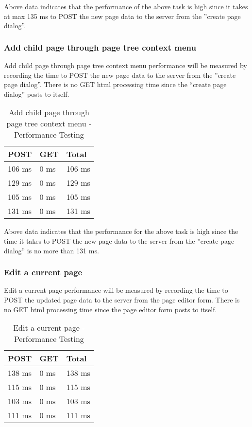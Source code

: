 \documentclass[12pt]{article}
\begin{document}
Above data indicates that the performance of the above task is high since it takes at max 135 ms to POST the new page data to the server from the ''create page dialog''.

\subsubsection{Add child page through page tree context menu}
Add child page through page tree context menu performance will be measured by recording the time to POST the new page data to the server from the ''create page dialog''. There is no GET html processing time since the “create page dialog” posts to itself.

\begin{table}[H]
\centering
\caption{Add child page through page tree context menu - Performance Testing}
\begin{tabular}{|l|l|l|}
\hline
POST   & GET  & Total  \\ \hline
106 ms & 0 ms & 106 ms \\ \hline
129 ms & 0 ms & 129 ms \\ \hline
105 ms & 0 ms & 105 ms \\ \hline
131 ms & 0 ms & 131 ms \\ \hline
\end{tabular}
\end{table}

Above data indicates that the performance for the above task is high since the time it takes to POST the new page data to the server from the ''create page dialog'' is no more than 131 ms.

\subsubsection{Edit a current page}
Edit a current page performance will be measured by recording the time to POST the updated page data to the server from the page editor form. There is no GET html processing time since the page editor form posts to itself.

\begin{table}[H]
\centering
\caption{Edit a current page - Performance Testing}
\begin{tabular}{|l|l|l|}
\hline
POST   & GET  & Total  \\ \hline
138 ms & 0 ms & 138 ms \\ \hline
115 ms & 0 ms & 115 ms \\ \hline
103 ms & 0 ms & 103 ms \\ \hline
111 ms & 0 ms & 111 ms \\ \hline
\end{tabular}
\end{table}
\end{document}
